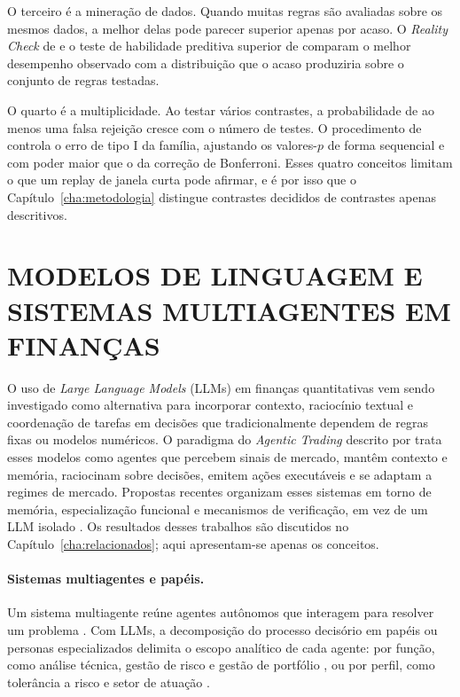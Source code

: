 O terceiro é a mineração de dados. Quando muitas regras são avaliadas sobre os mesmos dados, a melhor delas pode parecer superior apenas por acaso. O \textit{Reality Check} de \citet{White2000} e o teste de habilidade preditiva superior de \citet{Hansen2005} comparam o melhor desempenho observado com a distribuição que o acaso produziria sobre o conjunto de regras testadas.

O quarto é a multiplicidade. Ao testar vários contrastes, a probabilidade de ao menos uma falsa rejeição cresce com o número de testes. O procedimento de \citet{Holm1979} controla o erro de tipo I da família, ajustando os valores-$p$ de forma sequencial e com poder maior que o da correção de Bonferroni. Esses quatro conceitos limitam o que um replay de janela curta pode afirmar, e é por isso que o Capítulo~\ref{cha:metodologia} distingue contrastes decididos de contrastes apenas descritivos.

\section{MODELOS DE LINGUAGEM E SISTEMAS MULTIAGENTES EM FINANÇAS}

O uso de \textit{Large Language Models} (LLMs) em finanças quantitativas vem sendo investigado como alternativa para incorporar contexto, raciocínio textual e coordenação de tarefas em decisões que tradicionalmente dependem de regras fixas ou modelos numéricos. O paradigma do \textit{Agentic Trading} descrito por \citet[p. 1]{Xia2026} trata esses modelos como agentes que percebem sinais de mercado, mantêm contexto e memória, raciocinam sobre decisões, emitem ações executáveis e se adaptam a regimes de mercado. Propostas recentes organizam esses sistemas em torno de memória, especialização funcional e mecanismos de verificação, em vez de um LLM isolado \citep{Li2023, Xing2024, TradingAgents2024}. Os resultados desses trabalhos são discutidos no Capítulo~\ref{cha:relacionados}; aqui apresentam-se apenas os conceitos.

\paragraph*{Sistemas multiagentes e papéis.} Um sistema multiagente reúne agentes autônomos que interagem para resolver um problema \citep{Wooldridge2009}. Com LLMs, a decomposição do processo decisório em papéis ou personas especializados delimita o escopo analítico de cada agente: por função, como análise técnica, gestão de risco e gestão de portfólio \citep{TradingAgents2024}, ou por perfil, como tolerância a risco e setor de atuação \citep{Li2023}.

